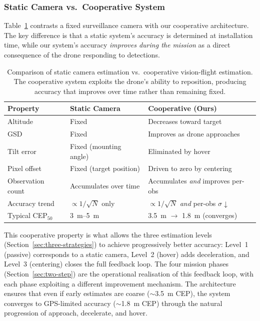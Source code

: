 \subsubsection{Static Camera vs.\ Cooperative System}

Table~\ref{tab:static-vs-cooperative} contrasts a fixed surveillance camera with our cooperative architecture.  The key difference is that a static system's accuracy is determined at installation time, while our system's accuracy \emph{improves during the mission} as a direct consequence of the drone responding to detections.

\begin{table}[H]
  \centering
  \caption{Comparison of static camera estimation vs.\ cooperative vision-flight estimation.  The cooperative system exploits the drone's ability to reposition, producing accuracy that improves over time rather than remaining fixed.}
  \label{tab:static-vs-cooperative}
  \begin{tabular}{lll}
    \toprule
    \textbf{Property} & \textbf{Static Camera} & \textbf{Cooperative (Ours)} \\
    \midrule
    Altitude          & Fixed                  & Decreases toward target \\
    GSD               & Fixed                  & Improves as drone approaches \\
    Tilt error        & Fixed (mounting angle) & Eliminated by hover \\
    Pixel offset      & Fixed (target position)& Driven to zero by centering \\
    Observation count & Accumulates over time  & Accumulates \emph{and} improves per-obs \\
    Accuracy trend    & $\propto 1/\sqrt{N}$ only & $\propto 1/\sqrt{N}$ \emph{and} per-obs $\sigma \downarrow$ \\
    Typical CEP$_{50}$ & \SI{3}{\metre}--\SI{5}{\metre}  & \SI{3.5}{\metre} $\to$ \SI{1.8}{\metre} (converges) \\
    \bottomrule
  \end{tabular}
\end{table}

\noindent This cooperative property is what allows the three estimation levels (Section~\ref{sec:three-strategies}) to achieve progressively better accuracy: Level~1 (passive) corresponds to a static camera, Level~2 (hover) adds deceleration, and Level~3 (centering) closes the full feedback loop.  The four mission phases (Section~\ref{sec:two-step}) are the operational realisation of this feedback loop, with each phase exploiting a different improvement mechanism.  The architecture ensures that even if early estimates are coarse ($\sim$\SI{3.5}{\metre} CEP), the system converges to GPS-limited accuracy ($\sim$\SI{1.8}{\metre} CEP) through the natural progression of approach, decelerate, and hover.

